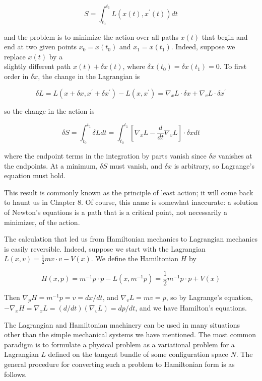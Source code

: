 \documentclass[10pt, letterpaper]{article}
\begin{document}
$$
S=\int_{t_{0}}^{t_{1}} L\left(x(t), x^{\prime}(t)\right) d t
$$

and the problem is to minimize the action over all paths $x(t)$ that begin and end at two given points $x_{0}=x\left(t_{0}\right)$ and $x_{1}=x\left(t_{1}\right)$. Indeed, suppose we replace $x(t)$ by a\\
slightly different path $x(t)+\delta x(t)$, where $\delta x\left(t_{0}\right)=\delta x\left(t_{1}\right)=0$. To first order in $\delta x$, the change in the Lagrangian is

$$
\delta L=L\left(x+\delta x, x^{\prime}+\delta x^{\prime}\right)-L\left(x, x^{\prime}\right)=\nabla_{x} L \cdot \delta x+\nabla_{v} L \cdot \delta x^{\prime}
$$

so the change in the action is

$$
\delta S=\int_{t_{0}}^{t_{1}} \delta L d t=\int_{t_{0}}^{t_{1}}\left[\nabla_{x} L-\frac{d}{d t} \nabla_{v} L\right] \cdot \delta x d t
$$

where the endpoint terms in the integration by parts vanish since $\delta x$ vanishes at the endpoints. At a minimum, $\delta S$ must vanish, and $\delta x$ is arbitrary, so Lagrange's equation must hold.

This result is commonly known as the principle of least action; it will come back to haunt us in Chapter 8. Of course, this name is somewhat inaccurate: a solution of Newton's equations is a path that is a critical point, not necessarily a minimizer, of the action.

The calculation that led us from Hamiltonian mechanics to Lagrangian mechanics is easily reversible. Indeed, suppose we start with the Lagrangian $L(x, v)= \frac{1}{2} m v \cdot v-V(x)$. We define the Hamiltonian $H$ by

$$
H(x, p)=m^{-1} p \cdot p-L\left(x, m^{-1} p\right)=\frac{1}{2} m^{-1} p \cdot p+V(x)
$$

Then $\nabla_{p} H=m^{-1} p=v=d x / d t$, and $\nabla_{v} L=m v=p$, so by Lagrange's equation, $-\nabla_{x} H=\nabla_{x} L=(d / d t)\left(\nabla_{v} L\right)=d p / d t$, and we have Hamilton's equations.

The Lagrangian and Hamiltonian machinery can be used in many situations other than the simple mechanical systems we have mentioned. The most common paradigm is to formulate a physical problem as a variational problem for a Lagrangian $L$ defined on the tangent bundle of some configuration space $N$. The general procedure for converting such a problem to Hamiltonian form is as follows.
\end{document}
